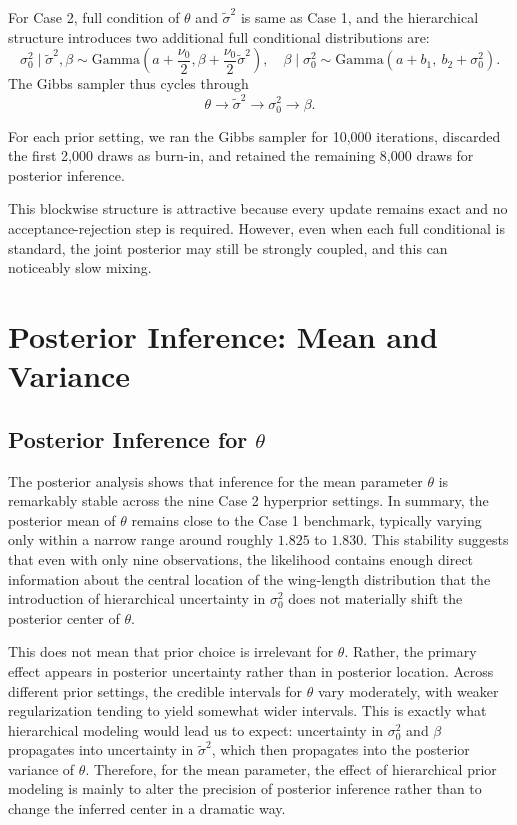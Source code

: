 \documentclass[11pt]{article}
\begin{document}
For Case 2, full condition of $\theta$ and $\tilde{\sigma}^2$ is same as Case 1, and the hierarchical structure introduces two additional full conditional distributions are:
\[
\sigma_0^2 \mid \tilde{\sigma}^2,\beta
\sim
\mathrm{Gamma}\left(
 a+\frac{\nu_0}{2},
 \beta+\frac{\nu_0}{2}\tilde{\sigma}^2
\right),
\quad
\beta \mid \sigma_0^2
\sim
\mathrm{Gamma}(a+b_1,\ b_2+\sigma_0^2).
\]
The Gibbs sampler thus cycles through
\[
\theta \longrightarrow \tilde{\sigma}^2 \longrightarrow \sigma_0^2 \longrightarrow \beta.
\]

For each prior setting, we ran the Gibbs sampler for 10,000 iterations, discarded the first 2,000 draws as burn-in, and retained the remaining 8,000 draws for posterior inference. 

This blockwise structure is attractive because every update remains exact and no acceptance-rejection step is required. However, even when each full conditional is standard, the joint posterior may still be strongly coupled, and this can noticeably slow mixing. 

\section{Posterior Inference: Mean and Variance}

\subsection{Posterior Inference for $\theta$}

The posterior analysis shows that inference for the mean parameter $\theta$ is remarkably stable across the nine Case 2 hyperprior settings. In summary, the posterior mean of $\theta$ remains close to the Case 1 benchmark, typically varying only within a narrow range around roughly $1.825$ to $1.830$. This stability suggests that even with only nine observations, the likelihood contains enough direct information about the central location of the wing-length distribution that the introduction of hierarchical uncertainty in $\sigma_0^2$ does not materially shift the posterior center of $\theta$.

This does not mean that prior choice is irrelevant for $\theta$. Rather, the primary effect appears in posterior uncertainty rather than in posterior location. Across different prior settings, the credible intervals for $\theta$ vary moderately, with weaker regularization tending to yield somewhat wider intervals. This is exactly what hierarchical modeling would lead us to expect: uncertainty in $\sigma_0^2$ and $\beta$ propagates into uncertainty in $\tilde{\sigma}^2$, which then propagates into the posterior variance of $\theta$. Therefore, for the mean parameter, the effect of hierarchical prior modeling is mainly to alter the precision of posterior inference rather than to change the inferred center in a dramatic way.
\end{document}
